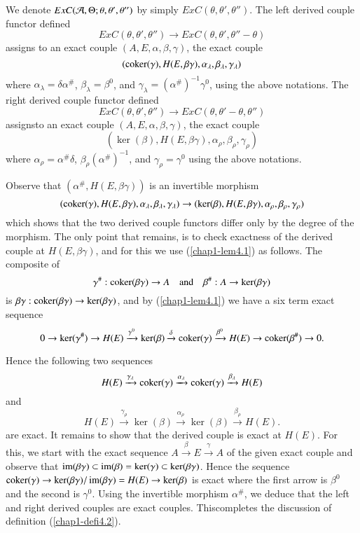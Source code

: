 \begin{definition}\label{chap1-defi4.2}
We denote $ExC(\mathcal{A},\Theta;\theta,\theta',\theta'')$ by simply
$ExC(\theta,\theta',\theta'')$. The left derived couple functor
defined
$$
ExC(\theta,\theta',\theta'')\to ExC(\theta,\theta',\theta''-\theta)
$$
assigns to an exact couple $(A,E,\alpha,\beta,\gamma)$, the exact
couple
$$
(\operatorname{coker}(\gamma),H(E,\beta\gamma),\alpha_{\lambda},\beta_{\lambda},\gamma_{\lambda})
$$
where $\alpha_{\lambda}=\delta\alpha^{\#}$,
$\beta_{\lambda}=\beta^{0}$, and
$\gamma_{\lambda}=(\alpha^{\#})^{-1}\gamma^{0}$, using the above
notations. The right derived couple functor defined
$$
ExC(\theta,\theta',\theta'')\to ExC(\theta,\theta'-\theta,\theta'')
$$
assigns\pageoriginale to an exact couple $(A,E,\alpha,\beta,\gamma)$,
the exact couple
$$
(\ker(\beta),H(E,\beta\gamma),\alpha_{\rho},\beta_{\rho},\gamma_{\rho})
$$
where $\alpha_{\rho}=\alpha^{\#}\delta$,
$\beta_{\rho}(\alpha^{\#})^{-1}$, and $\gamma_{\rho}=\gamma^{0}$ using
the above notations.

Observe that $(\alpha^{\#},H(E,\beta\gamma))$ is an invertible
morphism
$$
(\operatorname{coker}(\gamma),H(E,\beta\gamma),\alpha_{\lambda},\beta_{\lambda},\gamma_{\lambda})\to (\ker(\beta),H(E,\beta\gamma),\alpha_{\rho},\beta_{\rho},\gamma_{\rho})
$$
which shows that the two derived couple functors differ only by the
degree of the morphism. The only point that remains, is to check
exactness of the derived couple at $H(E,\beta\gamma)$, and for this we
use  (\ref{chap1-lem4.1}) as follows. The composite of
$$
\gamma^{\#}:\operatorname{coker}(\beta\gamma)\to A\quad\text{and}\quad \beta^{\#}:A\to
\ker(\beta\gamma) 
$$
is $\beta\gamma:\operatorname{coker}(\beta\gamma)\to \ker(\beta\gamma)$, and by
(\ref{chap1-lem4.1}) we have a six term exact sequence
{\fontsize{10}{12}\selectfont
$$
0\to\ker(\gamma^{\#})\to
H(E)\xrightarrow{\gamma^{0}}\ker(\beta)\xrightarrow{\delta}\operatorname{coker}(\gamma)\xrightarrow{\beta^{0}}H(E)\to
\operatorname{coker}(\beta^{\#})\to 0.
$$}
\end{definition}

Hence the following two sequences
$$
H(E)\xrightarrow{\gamma_{\lambda}}\operatorname{coker}(\gamma)\xrightarrow{\alpha_{\lambda}}\operatorname{coker}(\gamma)\xrightarrow{\beta_{\lambda}}H(E)
$$
and
$$
H(E)\xrightarrow{\gamma_{\rho}}\ker(\beta)\xrightarrow{\alpha_{\rho}}\ker(\beta)\xrightarrow{\beta_{\rho}}H(E).
$$
are exact. It remains to show that the derived couple is exact at
$H(E)$. For this, we start with the exact sequence
$A\xrightarrow{\beta}E\xrightarrow{\gamma}A$ of the given exact couple
and observe that $\operatorname{im}(\beta\gamma)\subset
\operatorname{im}(\beta)=\ker(\gamma)\subset \ker(\beta\gamma)$. Hence the sequence
$\operatorname{coker}(\gamma)\to \ker(\beta\gamma)/\operatorname{im}(\beta\gamma)=H(E)\to
\ker(\beta)$ is exact where the first arrow is $\beta^{0}$ and the
second is $\gamma^{0}$. Using the invertible morphism $\alpha^{\#}$,
we deduce that the left and right derived couples are exact
couples. This\pageoriginale completes the discussion of definition
(\ref{chap1-defi4.2}). 

